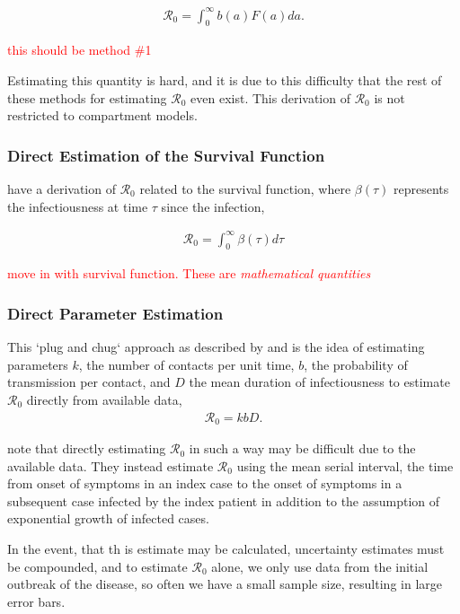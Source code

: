\documentclass[12pt]{article}
\newcommand{\com}[1]{\textcolor{red}{ #1}}
\newcommand{\rr}{\ensuremath{\mathcal{R}_0}}
\begin{document}
\begin{align}\label{eq:r0_survivalfxn}
  \rr = \int_0^\infty b(a)F(a)da.
\end{align}

\com{this should be method \#1}

Estimating this quantity is hard, and it is due to this difficulty that the rest of these methods for estimating $\rr$ even exist.  This derivation of $\rr$ is not restricted to compartment models.


\subsubsection{Direct Estimation of the Survival Function }
\label{sec:direct-estim-surv}

\cite{fraser2004factors} have a derivation of $\rr$ related to the survival function, where $\beta (\tau)$ represents the infectiousness at time $\tau$ since the infection,

\begin{align*}
\rr = \int_0^\infty \beta(\tau) d\tau
\end{align*}

\com{move in with survival function.  These are \textit{mathematical quantities}}



\subsubsection{Direct Parameter Estimation }
\label{sec:dpe}

This `plug and chug` approach as described by \cite{lipsitch2003} and \cite{dietz1993estimation} is the idea of estimating parameters $k$, the number of contacts per unit time, $b$, the probability of transmission per contact, and $D$ the mean duration of infectiousness to estimate $\rr$ directly from available data,
\begin{align}
\rr = kbD.
\end{align}

\cite{lipsitch2003} note that directly estimating $\rr$ in such a way may be difficult due to the available data.  They instead estimate $\rr$ using the mean serial interval, the time from onset of symptoms in an index case to the onset of symptoms in a subsequent case infected by the index patient in addition to the assumption of exponential growth of infected cases.

In the event, that th is estimate may be calculated, uncertainty estimates must be compounded, and to estimate $\rr$ alone, we only use data from the initial outbreak of the disease, so often we have a small sample size, resulting in large error bars.
\end{document}
